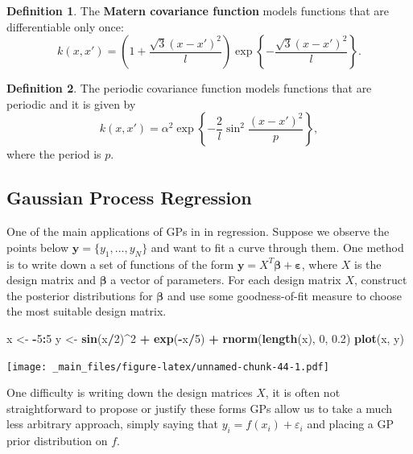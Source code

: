 \documentclass[
]{book}
\newenvironment{Shaded}{\begin{snugshade}}{\end{snugshade}}
\newcommand{\DecValTok}[1]{\textcolor[rgb]{0.00,0.00,0.81}{#1}}
\newcommand{\FloatTok}[1]{\textcolor[rgb]{0.00,0.00,0.81}{#1}}
\newcommand{\FunctionTok}[1]{\textcolor[rgb]{0.13,0.29,0.53}{\textbf{#1}}}
\newcommand{\NormalTok}[1]{#1}
\newcommand{\OtherTok}[1]{\textcolor[rgb]{0.56,0.35,0.01}{#1}}
\newcommand{\SpecialCharTok}[1]{\textcolor[rgb]{0.81,0.36,0.00}{\textbf{#1}}}
\theoremstyle{definition}
\newtheorem{definition}{Definition}[chapter]
\theoremstyle{definition}
\theoremstyle{definition}
\theoremstyle{definition}
\theoremstyle{remark}
\begin{document}
\begin{definition}
The \textbf{M\textquotesingle atern covariance function} models functions that are differentiable only once:
\[
k(x, x') = \left(1 + \frac{\sqrt{3}(x - x')^2}{l} \right)\exp\left\{-\frac{\sqrt{3}(x - x')^2}{l} \right\}.
\]
\end{definition}

\begin{definition}
The periodic covariance function models functions that are periodic and it is given by
\[
k(x, x') = \alpha^2 \exp\left\{-\frac{2}{l}\sin^2\frac{(x-x')^2}{p} \right\},
\]
where the period is \(p\).
\end{definition}

\hypertarget{gaussian-process-regression}{%
\subsection{Gaussian Process Regression}\label{gaussian-process-regression}}

One of the main applications of GPs in in regression. Suppose we observe the points below \(\boldsymbol{y} = \{y_1, \ldots, y_N\}\) and want to fit a curve through them. One method is to write down a set of functions of the form \(\boldsymbol{y} = X^T\boldsymbol{\beta} + \boldsymbol{\varepsilon}\), where \(X\) is the design matrix and \(\boldsymbol{\beta}\) a vector of parameters. For each design matrix \(X\), construct the posterior distributions for \(\boldsymbol{\beta}\) and use some goodness-of-fit measure to choose the most suitable design matrix.

\begin{Shaded}
\begin{Highlighting}[]
\NormalTok{x }\OtherTok{\textless{}{-}} \SpecialCharTok{{-}}\DecValTok{5}\SpecialCharTok{:}\DecValTok{5}
\NormalTok{y }\OtherTok{\textless{}{-}} \FunctionTok{sin}\NormalTok{(x}\SpecialCharTok{/}\DecValTok{2}\NormalTok{)}\SpecialCharTok{\^{}}\DecValTok{2} \SpecialCharTok{+} \FunctionTok{exp}\NormalTok{(}\SpecialCharTok{{-}}\NormalTok{x}\SpecialCharTok{/}\DecValTok{5}\NormalTok{) }\SpecialCharTok{+} \FunctionTok{rnorm}\NormalTok{(}\FunctionTok{length}\NormalTok{(x), }\DecValTok{0}\NormalTok{, }\FloatTok{0.2}\NormalTok{)}
\FunctionTok{plot}\NormalTok{(x, y)}
\end{Highlighting}
\end{Shaded}

\texttt{[image: \_main\_files/figure-latex/unnamed-chunk-44-1.pdf]}

One difficulty is writing down the design matrices \(X\), it is often not straightforward to propose or justify these forms GPs allow us to take a much less arbitrary approach, simply saying that \(y_i = f(x_i) + \varepsilon_i\) and placing a GP prior distribution on \(f\).
\end{document}
